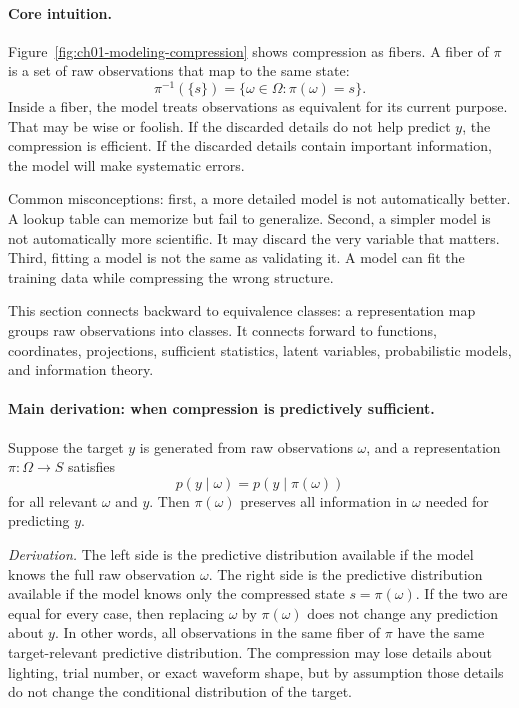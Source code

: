 \paragraph{Core intuition.}
Figure~\ref{fig:ch01-modeling-compression} shows compression as fibers. A fiber of \(\pi\) is a set of raw observations that map to the same state:
\[
\pi^{-1}(\{s\})=\{\omega\in\Omega:\pi(\omega)=s\}.
\]
Inside a fiber, the model treats observations as equivalent for its current purpose. That may be wise or foolish. If the discarded details do not help predict \(y\), the compression is efficient. If the discarded details contain important information, the model will make systematic errors.

Common misconceptions: first, a more detailed model is not automatically better. A lookup table can memorize but fail to generalize. Second, a simpler model is not automatically more scientific. It may discard the very variable that matters. Third, fitting a model is not the same as validating it. A model can fit the training data while compressing the wrong structure.

This section connects backward to equivalence classes: a representation map groups raw observations into classes. It connects forward to functions, coordinates, projections, sufficient statistics, latent variables, probabilistic models, and information theory.

\paragraph{Main derivation: when compression is predictively sufficient.}
Suppose the target \(y\) is generated from raw observations \(\omega\), and a representation \(\pi:\Omega\to S\) satisfies
\[
p(y\mid \omega)=p(y\mid \pi(\omega))
\]
for all relevant \(\omega\) and \(y\). Then \(\pi(\omega)\) preserves all information in \(\omega\) needed for predicting \(y\).

\emph{Derivation.} The left side is the predictive distribution available if the model knows the full raw observation \(\omega\). The right side is the predictive distribution available if the model knows only the compressed state \(s=\pi(\omega)\). If the two are equal for every case, then replacing \(\omega\) by \(\pi(\omega)\) does not change any prediction about \(y\). In other words, all observations in the same fiber of \(\pi\) have the same target-relevant predictive distribution. The compression may lose details about lighting, trial number, or exact waveform shape, but by assumption those details do not change the conditional distribution of the target.


